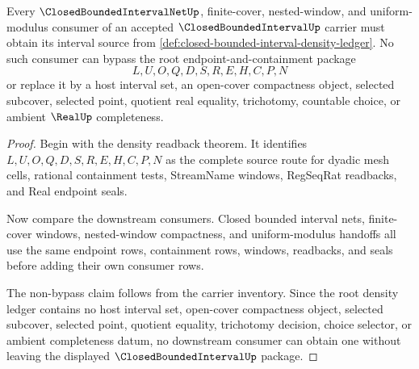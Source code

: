 \begin{theorem}
\label{thm:closed-bounded-interval-net-unblock-package}
Every $\ClosedBoundedIntervalNetUp$, finite-cover, nested-window, and uniform-modulus consumer of an accepted $\ClosedBoundedIntervalUp$ carrier must obtain its interval source from \autoref{def:closed-bounded-interval-density-ledger}. No such consumer can bypass the root endpoint-and-containment package
$$
L,U,O,Q,D,S,R,E,H,C,P,N
$$
or replace it by a host interval set, an open-cover compactness object, selected subcover, selected point, quotient real equality, trichotomy, countable choice, or ambient $\RealUp$ completeness.
\end{theorem}
\begin{proof}
Begin with the density readback theorem. It identifies $L,U,O,Q,D,S,R,E,H,C,P,N$ as the complete source route for dyadic mesh cells, rational containment tests, StreamName windows, RegSeqRat readbacks, and Real endpoint seals.

Now compare the downstream consumers. Closed bounded interval nets, finite-cover windows, nested-window compactness, and uniform-modulus handoffs all use the same endpoint rows, containment rows, windows, readbacks, and seals before adding their own consumer rows.

The non-bypass claim follows from the carrier inventory. Since the root density ledger contains no host interval set, open-cover compactness object, selected subcover, selected point, quotient equality, trichotomy decision, choice selector, or ambient completeness datum, no downstream consumer can obtain one without leaving the displayed $\ClosedBoundedIntervalUp$ package.
\end{proof}

